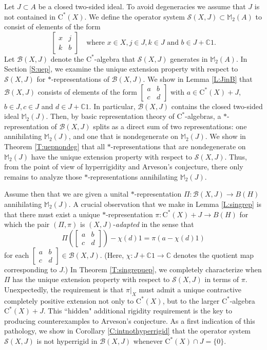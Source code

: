 \documentclass[10pt]{amsart}
\newcommand{\bC}{{\mathbb{C}}}
\newcommand{\bM}{{\mathbb{M}}}
\newcommand{\B}{{\mathcal{B}}}
\renewcommand{\S}{{\mathcal{S}}}
\newcommand{\rC}{\mathrm{C}}
\theoremstyle{definition}
\begin{document}
Let $J\subset A$ be a closed two-sided ideal. To avoid degeneracies we assume that $J$ is not contained in $\rC^*(X)$. We 
define the operator system $\S(X,J)\subset \bM_2(A)$ to consist of elements of the form
\begin{equation}\label{Eq:SXJ}
\begin{bmatrix}
x & j \\ k & b
\end{bmatrix} \quad \text{where } x\in X,j\in J,k\in J \text{ and }b\in J+\bC 1.
\end{equation}
Let $\B(X,J)$ denote the $\rC^*$-algebra that $\S(X,J)$ generates in $\bM_2(A)$.
In Section \ref{S:uep}, we examine the unique extension property with respect to $\S(X,J)$ for $*$-representations  of $\B(X,J)$. We show in Lemma \ref{L:JinB} that $\B(X,J)$ consists of elements of the form $\begin{bmatrix} a & b \\ c & d\end{bmatrix}$ with $a\in \rC^*(X)+J$, $b\in J,c\in J$ and $d\in J+\bC 1$. In particular, $\B(X,J)$ contains the closed two-sided ideal $\bM_2(J)$. 
Then, by basic representation theory of $\rC^*$-algebras, a  $*$-representation of $\B(X,J)$ splits as a direct sum of two representations: one annihilating $\bM_2(J)$, and one that is nondegenerate   on $\bM_2(J)$. We show in Theorem \ref{T:uepnondeg} that all $*$-representations that are nondegenerate on $\bM_2(J)$ have the unique extension property with respect to $\S(X,J)$. Thus, from the point of view of hyperrigidity and Arveson's conjecture, there only remains to analyze those $*$-representations annihilating $\bM_2(J)$. 

Assume  then that we are given a unital $*$-representation $\Pi:\B(X,J)\to B(H)$ annihilating $\bM_2(J)$. A crucial observation that we make in Lemma \ref{L:singrep} is that there must exist a unique $*$-representation  $\pi:\rC^*(X)+J\to B(H)$ for which the pair $(\Pi,\pi)$ is $(X,J)$-\emph{adapted} in the sense that
\[
\Pi\left(\begin{bmatrix}
a& b \\ c & d
\end{bmatrix}\right)-\chi(d)1=\pi(a-\chi(d)1)
\]
for each $\begin{bmatrix}
a& b \\ c & d
\end{bmatrix}\in \B(X,J)$. (Here, $\chi:J+\bC 1\to \bC$ denotes the quotient map corresponding to $J$.) In Theorem \ref{T:singrepuep}, we completely characterize when $\Pi$ has the unique extension property with respect to $\S(X,J)$  in terms of $\pi$. Unexpectedly, the requirement is that  $\pi|_{X}$ must admit a unique contractive completely positive extension not only to $\rC^*(X)$, but to the larger $\rC^*$-algebra $\rC^*(X)+J$. This ``hidden" additional rigidity requirement is the key to producing counterexamples to Arveson's conjecture. As a first indication of this pathology, we show in Corollary \ref{C:intnothyperrigid} that the operator system $\S(X,J)$ is not hyperrigid in $\B(X,J)$ whenever $\rC^*(X)\cap J=\{0\}$.
\end{document}
